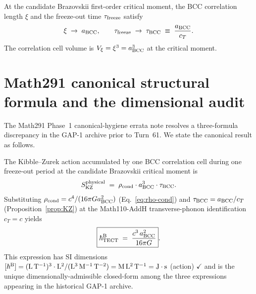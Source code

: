 \begin{proposition}
\label{prop:KZ}
At the candidate Brazovskii first-order critical moment, the BCC
correlation length $\xi$ and the freeze-out time $\tau_{\rm freeze}$
satisfy
\begin{equation}
\xi \;\to\; a_{\rm BCC},\qquad
\tau_{\rm freeze} \;\to\; \tau_{\rm BCC} \;\equiv\; \frac{a_{\rm BCC}}{c_T}.
\end{equation}
The correlation cell volume is $V_\xi = \xi^3 = a_{\rm BCC}^3$ at
the critical moment.
\end{proposition}

\section{Math291 canonical structural formula and the dimensional
audit}\label{sec:Math291}

The Math291 Phase~1 canonical-hygiene errata note resolves a
three-formula discrepancy in the GAP-1 archive prior to Turn~61. We
state the canonical result as follows.

\begin{theorem}
\label{thm:Math291}
The Kibble--Zurek action accumulated by one BCC correlation cell
during one freeze-out period at the candidate Brazovskii critical
moment is
\begin{equation}
S^{\rm physical}_{\rm KZ} \;=\;
\rho_{\rm cond}\cdot a_{\rm BCC}^3 \cdot \tau_{\rm BCC}.
\end{equation}
Substituting $\rho_{\rm cond} = c^4 / (16\pi G a_{\rm BCC}^2)$
(Eq.~\ref{eq:rho-cond}) and $\tau_{\rm BCC} = a_{\rm BCC}/c_T$
(Proposition~\ref{prop:KZ}) at the Math110-AddH transverse-phonon
identification $c_T = c$ yields
\begin{equation}
\boxed{\hbar^{\rm B}_{\rm TECT}
\;=\; \frac{c^3\, a_{\rm BCC}^2}{16\pi G}}.
\label{eq:formulaB}
\end{equation}
This expression has SI dimensions
$[\hbar^{\rm B}] = (\mathrm{L\,T^{-1}})^3 \cdot \mathrm{L}^2 /
(\mathrm{L^3\,M^{-1}\,T^{-2}}) = \mathrm{M\,L^2\,T^{-1}}
= \mathrm{J\cdot s}$ (action) $\checkmark$ and is the unique
dimensionally-admissible closed-form among the three expressions
appearing in the historical GAP-1 archive.
\end{theorem}

